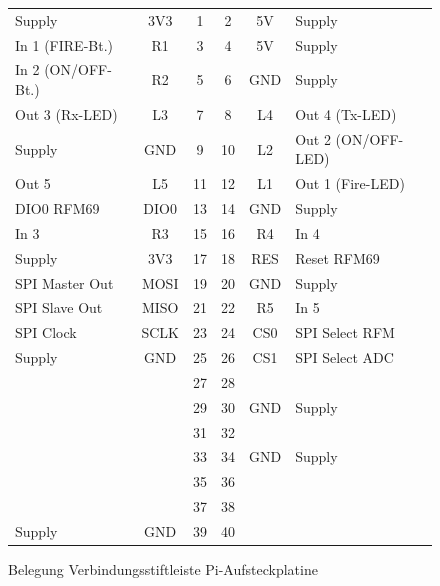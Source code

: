\documentclass[paper=a4, parskip, numbers=noenddot, toc=listof, headsepline]{scrbook}
\begin{document}
				\begin{figure}
					\centering
					\begin{tabularx}{\textwidth}{Xc|cc|cX}
						\cline{3-4}
						Supply            & 3V3  & 1  & 2  & 5V  & Supply             \\
						In 1 (FIRE-Bt.)   & R1   & 3  & 4  & 5V  & Supply             \\
						In 2 (ON/OFF-Bt.) & R2   & 5  & 6  & GND & Supply             \\
						Out 3 (Rx-LED)    & L3   & 7  & 8  & L4  & Out 4 (Tx-LED)     \\
						Supply            & GND  & 9  & 10 & L2  & Out 2 (ON/OFF-LED) \\
						Out 5             & L5   & 11 & 12 & L1  & Out 1 (Fire-LED)   \\
						DIO0 RFM69        & DIO0 & 13 & 14 & GND & Supply             \\
						In 3              & R3   & 15 & 16 & R4  & In 4               \\
						Supply            & 3V3  & 17 & 18 & RES & Reset RFM69        \\
						SPI Master Out    & MOSI & 19 & 20 & GND & Supply             \\
						SPI Slave Out     & MISO & 21 & 22 & R5  & In 5               \\
						SPI Clock         & SCLK & 23 & 24 & CS0 & SPI Select RFM     \\
						Supply            & GND  & 25 & 26 & CS1 & SPI Select ADC     \\
						~                 &      & 27 & 28 &     &                    \\
						~                 &      & 29 & 30 & GND & Supply             \\
						~                 &      & 31 & 32 &     &                    \\
						~                 &      & 33 & 34 & GND & Supply             \\
						~                 &      & 35 & 36 &     &                    \\
						~                 &      & 37 & 38 &     &                    \\
						Supply            & GND  & 39 & 40 &     &                    \\ \cline{3-4}
					\end{tabularx}
					\caption{Belegung Verbindungsstiftleiste Pi-Aufsteckplatine}
					\label{fig:piheader}
				\end{figure}
\end{document}
